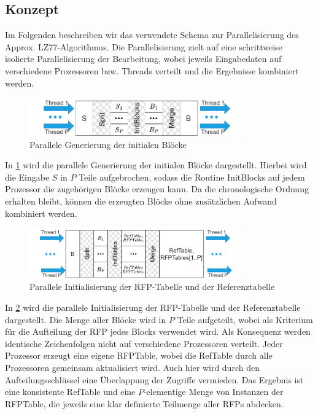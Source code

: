 \subsection{Konzept}
Im Folgenden beschreiben wir das verwendete Schema zur Parallelisierung des Approx. LZ77-Algorithmus. Die Parallelisierung zielt auf eine schrittweise isolierte Parallelisierung der Bearbeitung, wobei
jeweils Eingabedaten auf verschiedene Prozessoren bzw. Threads verteilt und die Ergebnisse kombiniert werden.
\begin{figure}[ht]
    \centering
    \includegraphics[width=0.8\textwidth]{Images/parallel_initnodes.png}
    \caption{Parallele Generierung der initialen Blöcke}
    \label{fig:parinitnodes}
\end{figure}
In \ref{fig:parinitnodes} wird die parallele Generierung der initialen Blöcke dargestellt. Hierbei wird die Eingabe $S$ in $P$ Teile aufgebrochen, sodass die Routine InitBlocks auf jedem Prozessor
die zugehörigen Blöcke erzeugen kann. Da die chronologische Ordnung erhalten bleibt, können die erzeugten Blöcke ohne zusätzlichen Aufwand kombiniert werden.

\begin{figure}[ht]
    \centering
    \includegraphics[width=0.8\textwidth]{Images/parallel_inittables.png}
    \caption{Parallele Initialisierung der RFP-Tabelle und der Referenztabelle}
    \label{fig:parinittables}
\end{figure}
In \ref{fig:parinittables} wird die parallele Initialisierung der RFP-Tabelle und der Referenztabelle dargestellt. Die Menge aller Blöcke wird in $P$ Teile aufgeteilt, wobei als Kriterium für die
Aufteilung der RFP jedes Blocks verwendet wird. Als Konsequenz werden identische Zeichenfolgen nicht auf verschiedene Prozessoren verteilt. Jeder Prozessor erzeugt eine eigene RFPTable, wobei
die RefTable durch alle Prozessoren gemeinsam aktualisiert wird. Auch hier wird durch den Aufteilungsschlüssel eine Überlappung der Zugriffe vermieden. Das Ergebnis ist eine konsistente
RefTable und eine $P$-elementige Menge von Instanzen der RFPTable, die jeweils eine klar definierte Teilmenge aller RFPs abdecken.

